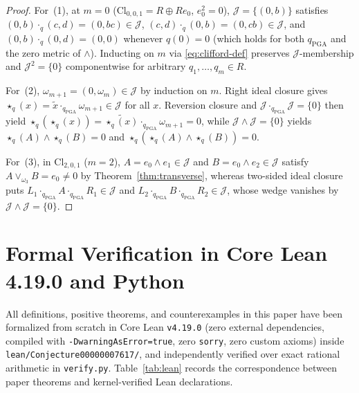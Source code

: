 \documentclass[11pt]{article}
\theoremstyle{definition}
\newcommand{\Cl}{\mathrm{Cl}}
\begin{document}
\begin{proof}
For~(1), at $m = 0$ ($\Cl_{0,0,1} = R \oplus R e_0$, $e_0^2 = 0$), $\mathcal{J} = \{(0, b)\}$ satisfies $(0,b)\cdot_q (c,d) = (0, bc) \in \mathcal{J}$, $(c,d)\cdot_q (0,b) = (0, cb) \in \mathcal{J}$, and $(0,b)\cdot_q (0,d) = (0,0)$ whenever $q(0) = 0$ (which holds for both $q_{\mathrm{PGA}}$ and the zero metric of $\wedge$). Inducting on $m$ via \eqref{eq:clifford-def} preserves $\mathcal{J}$-membership and $\mathcal{J}^2 = \{0\}$ componentwise for arbitrary $q_1, \dots, q_m \in R$.

For~(2), $\omega_{m+1} = (0, \omega_m) \in \mathcal{J}$ by induction on $m$. Right ideal closure gives $\star_q(x) = \widetilde{x}\cdot_{q_{\mathrm{PGA}}} \omega_{m+1} \in \mathcal{J}$ for all $x$. Reversion closure and $\mathcal{J}\cdot_{q_{\mathrm{PGA}}} \mathcal{J} = \{0\}$ then yield $\star_q(\star_q(x)) = \widetilde{\star_q(x)}\cdot_{q_{\mathrm{PGA}}} \omega_{m+1} = 0$, while $\mathcal{J} \wedge \mathcal{J} = \{0\}$ yields $\star_q(A) \wedge \star_q(B) = 0$ and $\star_q(\star_q(A) \wedge \star_q(B)) = 0$.

For~(3), in $\Cl_{2,0,1}$ ($m = 2$), $A = e_0 \wedge e_1 \in \mathcal{J}$ and $B = e_0 \wedge e_2 \in \mathcal{J}$ satisfy $A \vee_{\omega_3} B = e_0 \neq 0$ by Theorem~\ref{thm:transverse}, whereas two-sided ideal closure puts $L_1 \cdot_{q_{\mathrm{PGA}}} A \cdot_{q_{\mathrm{PGA}}} R_1 \in \mathcal{J}$ and $L_2 \cdot_{q_{\mathrm{PGA}}} B \cdot_{q_{\mathrm{PGA}}} R_2 \in \mathcal{J}$, whose wedge vanishes by $\mathcal{J} \wedge \mathcal{J} = \{0\}$.
\end{proof}

\section{Formal Verification in Core Lean 4.19.0 and Python}\label{sec:lean}

All definitions, positive theorems, and counterexamples in this paper have been formalized from scratch in Core Lean \texttt{v4.19.0} (zero external dependencies, compiled with \texttt{-DwarningAsError=true}, zero \texttt{sorry}, zero custom axioms) inside \texttt{lean/Conjecture00000007617/}, and independently verified over exact rational arithmetic in \texttt{verify.py}. Table~\ref{tab:lean} records the correspondence between paper theorems and kernel-verified Lean declarations.
\end{document}
